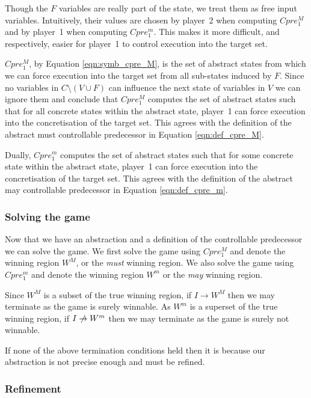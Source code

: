 Though the $F$ variables are really part of the state, we treat them as free input variables. Intuitively, their values are chosen by player~2 when computing $Cpre_1^M$ and by player~1 when computing $Cpre_1^m$. This makes it more difficult, and respectively, easier for player~1 to control execution into the target set.

$Cpre_1^M$, by Equation \ref{eqn:symb_cpre_M}, is the set of abstract states from which we can force execution into the target set from all sub-states induced by $F$. Since no variables in $C \setminus (V \cup F)$ can influence the next state of variables in $V$ we can ignore them and conclude that $Cpre_1^M$ computes the set of abstract states such that for all concrete states within the abstract state, player~1 can force execution into the concretisation of the target set. This agrees with the definition of the abstract must controllable predecessor in Equation \ref{eqn:def_cpre_M}.

Dually, $Cpre_1^m$ computes the set of abstract states such that for some concrete state within the abstract state, player~1 can force execution into the concretisation of the target set. This agrees with the definition of the abstract may controllable predecessor in Equation \ref{eqn:def_cpre_m}.


\subsubsection{Solving the game}

Now that we have an abstraction and a definition of the controllable predecessor we can solve the game. We first solve the game using $Cpre_1^M$ and denote the winning region $W^M$, or the \emph{must} winning region. We also solve the game using $Cpre_1^m$ and denote the winning region $W^m$ or the \emph{may} winning region.

Since $W^M$ is a subset of the true winning region, if $I \rightarrow W^M$ then we may terminate as the game is surely winnable. As $W^m$ is a superset of the true winning region, if $I \centernot\rightarrow W^m$ then we may terminate as the game is surely not winnable.

If none of the above termination conditions held then it is because our abstraction is not precise enough and must be refined.


\subsubsection{Refinement}

